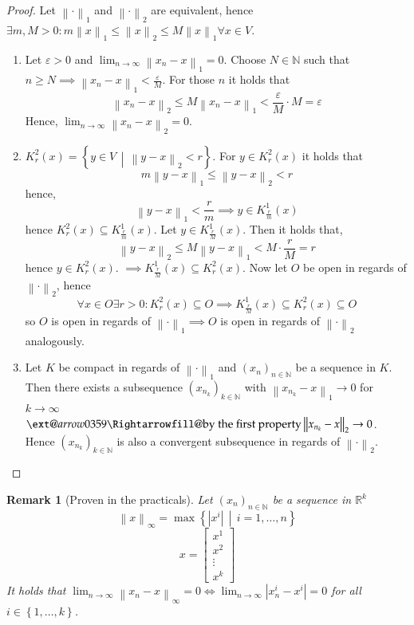 \documentclass{article}
\makeatletter
\newtheorem{remark}{Remark}  \numberwithin{remark}{section}
\newcommand{\set}[1]{\left\{#1\right\}}
\newcommand{\setdef}[2]{\left\{\left.#1\,\middle|\,#2\right.\right\}}
\newcommand{\norm}[1]{\left\|#1\right\|}
\newcommand{\card}[1]{\left|#1\right|}
\newcommand{\xRightarrow}[2][]{\ext@arrow 0359\Rightarrowfill@{#1}{#2}}
\makeatother
\begin{document}
\begin{proof}
  Let $\norm{\cdot}_1$ and $\norm{\cdot}_2$ are equivalent, hence $\exists m, M > 0: m \norm{x}_1 \leq \norm{x}_2 \leq M \norm{x}_1 \forall x \in V$.
  \begin{enumerate}
    \item Let $\varepsilon > 0$ and $\lim_{n\to\infty} \norm{x_n - x}_1 = 0$.
      Choose $N \in \mathbb N$ such that $n \geq N \implies \norm{x_n - x}_1 < \frac{\varepsilon}{M}$. For those $n$ it holds that
      \[ \norm{x_n - x}_2 \leq M \norm{x_n - x}_1 < \frac{\varepsilon}{M} \cdot M = \varepsilon \]
      Hence, $\lim_{n\to\infty} \norm{x_n - x}_2 = 0$.
    \item $K_r^2(x) = \setdef{y \in V}{\norm{y - x}_2 < r}$. For $y \in K_r^2(x)$ it holds that
      \[ m \norm{y - x}_1 \leq \norm{y - x}_2 < r \]
      hence,
      \[ \norm{y - x}_1 < \frac rm \implies y \in K_{\frac rm}^1(x) \]
      hence $K_r^2(x) \subseteq K_{\frac rm}^1(x)$.
      Let $y \in K_{\frac rM}^1(x)$. Then it holds that,
      \[ \norm{y - x}_2 \leq M \norm{y - x}_1 < M \cdot \frac rM = r \]
      hence $y \in K_r^2(x)$. $\implies K_{\frac rM}^1(x) \subseteq K_r^2(x)$.
      Now let $O$ be open in regards of $\norm{\cdot}_2$, hence
      \[ \forall x \in O \exists r > 0: K_r^2(x) \subseteq O \implies K_{\frac rM}^1(x) \subseteq K_r^2(x) \subseteq O \]
      so $O$ is open in regards of $\norm{\cdot}_1 \implies O$ is open in regards of $\norm{\cdot}_2$ analogously.
    \item
      Let $K$ be compact in regards of $\norm{\cdot}_1$ and $(x_n)_{n \in \mathbb N}$ be a sequence in $K$.
      Then there exists a subsequence $(x_{n_k})_{k \in \mathbb N}$ with $\norm{x_{n_k} - x}_1 \to 0$ for $k \to \infty$
      $\xRightarrow{\text{by the first property}} \norm{x_{n_k} - x}_2 \to 0$. Hence $(x_{n_k})_{k \in \mathbb N}$ is also a convergent subsequence in regards of $\norm{\cdot}_2$.
  \end{enumerate}
\end{proof}

\begin{remark}[Proven in the practicals]
  Let $(x_n)_{n\in\mathbb N}$ be a sequence in $\mathbb R^k$
  \[ \norm{x}_{\infty} = \max\setdef{\card{x^i}}{i = 1, \dots, n} \]
  \[ x = \begin{bmatrix} x^1 \\ x^2 \\ \vdots \\ x^k \end{bmatrix} \]
  It holds that $\lim_{n\to\infty} \norm{x_n - x}_{\infty} = 0 \iff \lim_{n\to\infty} \card{x_n^i - x^i} = 0$ for all $i \in \set{1, \dots, k}$.
\end{remark}
\end{document}
